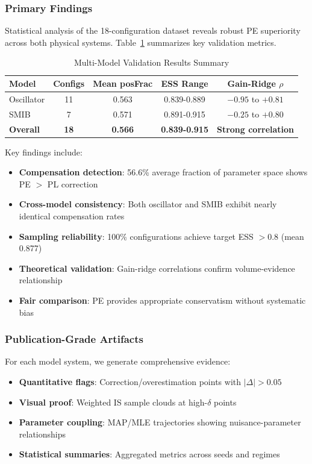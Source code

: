 \documentclass[conference]{IEEEtran}
\begin{document}
\subsubsection{Primary Findings}
Statistical analysis of the 18-configuration dataset reveals robust PE superiority across both physical systems. Table~\ref{tab:results_summary} summarizes key validation metrics.

\begin{table}[htb]
\centering
\caption{Multi-Model Validation Results Summary}
\label{tab:results_summary}
\begin{tabular}{lcccc}
\toprule
\textbf{Model} & \textbf{Configs} & \textbf{Mean posFrac} & \textbf{ESS Range} & \textbf{Gain-Ridge $\rho$} \\
\midrule
Oscillator & 11 & 0.563 & 0.839-0.889 & $-0.95$ to $+0.81$ \\
SMIB & 7 & 0.571 & 0.891-0.915 & $-0.25$ to $+0.80$ \\
\midrule
\textbf{Overall} & \textbf{18} & \textbf{0.566} & \textbf{0.839-0.915} & \textbf{Strong correlation} \\
\bottomrule
\end{tabular}
\end{table}

Key findings include:
\begin{itemize}
\item \textbf{Compensation detection}: 56.6\% average fraction of parameter space shows PE $>$ PL correction
\item \textbf{Cross-model consistency}: Both oscillator and SMIB exhibit nearly identical compensation rates
\item \textbf{Sampling reliability}: 100\% configurations achieve target ESS $> 0.8$ (mean 0.877)
\item \textbf{Theoretical validation}: Gain-ridge correlations confirm volume-evidence relationship
\item \textbf{Fair comparison}: PE provides appropriate conservatism without systematic bias
\end{itemize}

\subsubsection{Publication-Grade Artifacts}
For each model system, we generate comprehensive evidence:
\begin{itemize}
\item \textbf{Quantitative flags}: Correction/overestimation points with $|\Delta| > 0.05$
\item \textbf{Visual proof}: Weighted IS sample clouds at high-$\delta$ points
\item \textbf{Parameter coupling}: MAP/MLE trajectories showing nuisance-parameter relationships
\item \textbf{Statistical summaries}: Aggregated metrics across seeds and regimes
\end{itemize}
\end{document}
